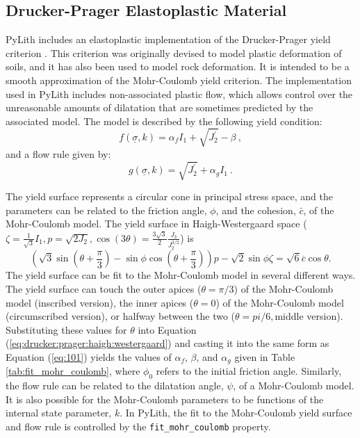 \subsection{Drucker-Prager Elastoplastic Material}

PyLith includes an elastoplastic implementation of the Drucker-Prager
yield criterion \cite{Drucker:Prager:1952}. This criterion was originally
devised to model plastic deformation of soils, and it has also been
used to model rock deformation. It is intended to be a smooth approximation
of the Mohr-Coulomb yield criterion. The implementation used in PyLith
includes non-associated plastic flow, which allows control over the
unreasonable amounts of dilatation that are sometimes predicted by
the associated model. The model is described by the following yield
condition:
\begin{equation}
f\left(\underline{\sigma},k\right)=\alpha_{f}I_{1}+\sqrt{J_{2}^{\prime}}-\beta\:,\label{eq:100}
\end{equation}
and a flow rule given by:
\begin{equation}
g\left(\underline{\sigma},k\right)=\sqrt{J_{2}^{\prime}}+\alpha_{g}I_{1}\:.\label{eq:101}
\end{equation}


The yield surface represents a circular cone in principal stress space,
and the parameters can be related to the friction angle, $\phi$,
and the cohesion, $\bar{c}$, of the Mohr-Coulomb model. The yield
surface in Haigh-Westergaard space ($\zeta=\frac{1}{\sqrt{3}}I_{1},p=\sqrt{2J_{2}},\cos(3\theta)=\frac{3\sqrt{3}}{2}\frac{J_{3}}{J_{2}^{3/2}}$)
is
\begin{equation}
\left(\sqrt{3}\sin\left(\theta+\frac{\pi}{3}\right)-\sin\phi\cos\left(\theta+\frac{\pi}{3}\right)\right)p-\sqrt{2}\sin\phi\zeta=\sqrt{6}\overline{c}\cos\theta.\label{eq:drucker:prager:haigh:westergaard}
\end{equation}
The yield surface can be fit to the Mohr-Coulomb model in several
different ways. The yield surface can touch the outer apices ($\theta=\pi/3$)
of the Mohr-Coulomb model (inscribed version), the inner apices ($\theta=0$)
of the Mohr-Coulomb model (circumscribed version), or halfway between
the two ($\theta=pi/6,$middle version). Substituting these values
for $\theta$ into Equation (\ref{eq:drucker:prager:haigh:westergaard})
and casting it into the same form as Equation (\ref{eq:101}) yields
the values of $\alpha_{f}$, $\beta$, and $\alpha_{g}$ given in
Table \ref{tab:fit_mohr_coulomb}, where $\phi_{0}$ refers to the
initial friction angle. Similarly, the flow rule can be related to
the dilatation angle, $\psi$, of a Mohr-Coulomb model. It is also
possible for the Mohr-Coulomb parameters to be functions of the internal
state parameter, $k$. In PyLith, the fit to the Mohr-Coulomb yield
surface and flow rule is controlled by the \texttt{fit\_mohr\_coulomb}
property. 

